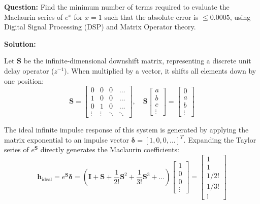 \documentclass[11pt, a4paper]{article}
\begin{document}
\noindent \textbf{Question:} Find the minimum number of terms required to evaluate the Maclaurin series of $e^x$ for $x = 1$ such that the absolute error is $\le 0.0005$, using Digital Signal Processing (DSP) and Matrix Operator theory.

\vspace{0.6cm}

\noindent \textbf{Solution:} 

\vspace{0.3cm}

\noindent Let $\mathbf{S}$ be the infinite-dimensional downshift matrix, representing a discrete unit delay operator ($z^{-1}$). When multiplied by a vector, it shifts all elements down by one position:
\begin{equation}
    \mathbf{S} = \begin{bmatrix} 0 & 0 & 0 & \dots \\ 1 & 0 & 0 & \dots \\ 0 & 1 & 0 & \dots \\ \vdots & \vdots & \ddots & \ddots \end{bmatrix}, \quad \mathbf{S} \begin{bmatrix} a \\ b \\ c \\ \vdots \end{bmatrix} = \begin{bmatrix} 0 \\ a \\ b \\ \vdots \end{bmatrix}
\end{equation}

\noindent The ideal infinite impulse response of this system is generated by applying the matrix exponential to an impulse vector $\mathbf{\delta} = [1, 0, 0, \dots]^T$. Expanding the Taylor series of $e^{\mathbf{S}}$ directly generates the Maclaurin coefficients:
\begin{equation}
    \mathbf{h}_{\text{ideal}} = e^{\mathbf{S}} \mathbf{\delta} = \left( \mathbf{I} + \mathbf{S} + \frac{1}{2!} \mathbf{S}^2 + \frac{1}{3!} \mathbf{S}^3 + \dots \right) \begin{bmatrix} 1 \\ 0 \\ 0 \\ \vdots \end{bmatrix} = \begin{bmatrix} 1 \\ 1 \\ 1/2! \\ 1/3! \\ \vdots \end{bmatrix}
\end{equation}
\end{document}
